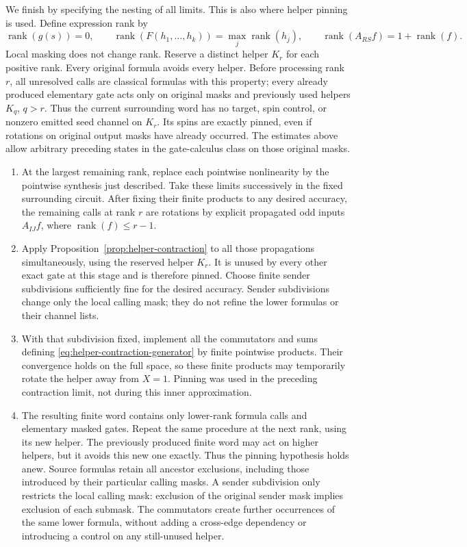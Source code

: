 We finish by specifying the nesting of all limits.  This is also
where helper pinning is used.  Define expression rank by
\[
 \operatorname{rank}(g(s))=0,\qquad
 \operatorname{rank}(F(h_1,\ldots,h_k))=\max_j\operatorname{rank}(h_j),
 \qquad
 \operatorname{rank}(A_{RS}f)=1+\operatorname{rank}(f).
\]
Local masking does not change rank.  Reserve a distinct helper
\(K_r\) for each positive rank.  Every original formula avoids
every helper.  Before processing rank \(r\), all unresolved calls
are classical formulas with this property; every already produced
elementary gate acts only on original masks and previously used
helpers \(K_q\), \(q>r\).  Thus the current surrounding word has
no target, spin control, or nonzero emitted seed channel on \(K_r\).
Its spins are exactly pinned, even if rotations on original output
masks have already occurred.  The estimates above allow arbitrary
preceding states in the gate-calculus class on those original masks.

\begin{enumerate}
\item At the largest remaining rank, replace each pointwise
nonlinearity by the pointwise synthesis just described.  Take these
limits successively in the fixed surrounding circuit.  After fixing
their finite products to any desired accuracy, the remaining calls
at rank \(r\) are rotations by explicit propagated odd inputs
\(A_{IJ}f\), where \(\operatorname{rank}(f)\le r-1\).

\item Apply Proposition~\ref{prop:helper-contraction} to all those
propagations simultaneously, using the reserved helper \(K_r\).
It is unused by every other exact gate at this stage and is
therefore pinned.  Choose finite sender subdivisions sufficiently
fine for the desired accuracy.  Sender subdivisions change only
the local calling mask; they do not refine the lower formulas or
their channel lists.

\item With that subdivision fixed, implement all the commutators
and sums defining \eqref{eq:helper-contraction-generator} by finite
pointwise products.  Their convergence holds on the full space, so
these finite products may temporarily rotate the helper away from
\(X=1\).  Pinning was used in the preceding contraction limit,
not during this inner approximation.

\item The resulting finite word contains only lower-rank formula
calls and elementary masked gates.  Repeat the same procedure at
the next rank, using its new helper.  The previously produced
finite word may act on higher helpers, but it avoids this new one
exactly.  Thus the pinning hypothesis holds anew.  Source formulas
retain all ancestor exclusions, including those introduced by their
particular calling masks. A sender subdivision only restricts the
local calling mask: exclusion of the original sender mask implies
exclusion of each submask. The commutators create further occurrences
of the same lower formula, without adding a cross-edge dependency or
introducing a control on any still-unused helper.
\end{enumerate}

